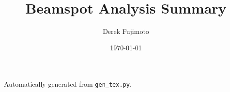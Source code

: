 \documentclass{article}
\title{Beamspot Analysis Summary}
\author{Derek Fujimoto}
\date{\today}
\begin{document}
\maketitle

Automatically generated from \texttt{gen\_tex.py}.





\printbibliography
%
\end{document}
